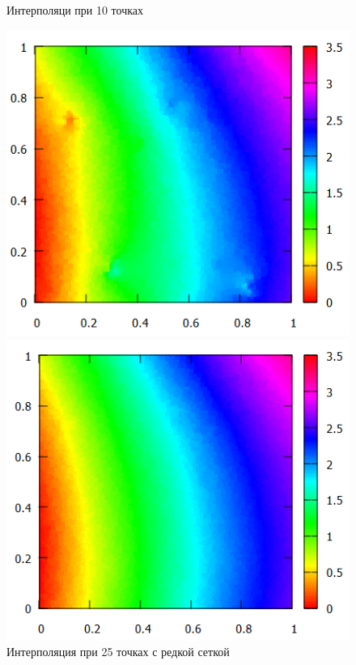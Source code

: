 \documentclass[14pt, a4paper]{extarticle}
\begin{document}
\begin{enumerate}
\begin{figure}[H]
\begin{minipage}{0.5\textwidth}
					\caption[.] {Интерполяци при 10 точках}
				\end{minipage}\hfill
			\end{figure}
			\begin{figure}[H]
				\begin{minipage}{0.5\textwidth}
					\centering
					\includegraphics[width = \linewidth]{../1func/M=25T=3718Err=0.032763.png}
					\caption[.] {Интерполяция при 25 точках с редкой сеткой}
				\end{minipage}\hfill
				\begin{minipage}{0.5\textwidth}
					\centering
					\includegraphics[width = \linewidth]{../1func/M=25T=5774Err=0.008207.png}

\end{minipage}
\end{figure}
\end{enumerate}
\end{document}
